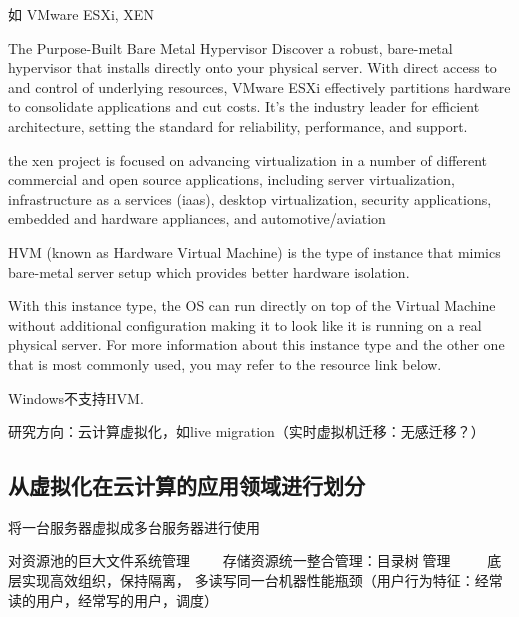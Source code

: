 如 VMware ESXi, XEN

\begin{definition}
    The Purpose-Built Bare Metal Hypervisor
Discover a robust, bare-metal hypervisor that installs directly onto your physical server. With direct access to and control of underlying resources, VMware ESXi effectively partitions hardware to consolidate applications and cut costs. It’s the industry leader for efficient architecture, setting the standard for reliability, performance, and support.
\end{definition}

\begin{definition}[Xen]
    the xen project is focused on advancing virtualization in a number of different commercial and open source applications, including server virtualization, infrastructure as a services (iaas), desktop virtualization, security applications, embedded and hardware appliances, and automotive/aviation
\end{definition}

\begin{definition}
    HVM (known as Hardware Virtual Machine) is the type of instance that mimics bare-metal server setup which provides better hardware isolation. 
    
    With this instance type, the OS can run directly on top of the Virtual Machine without additional configuration making it to look like it is running on a real physical server. For more information about this instance type and the other one that is most commonly used, you may refer to the resource link below.
\end{definition}

\begin{remark}
    Windows不支持HVM.
\end{remark}

研究方向：云计算虚拟化，如live migration（实时虚拟机迁移：无感迁移？）


\subsection{从虚拟化在云计算的应用领域进行划分}
\begin{definition}[服务器虚拟化]
    将一台服务器虚拟成多台服务器进行使用

    对资源池的巨大文件系统管理 
　　存储资源统一整合管理：目录树🌲管理
　　🔀底层实现高效组织，保持隔离，
多‍‍‍读写同一台机器性能瓶颈（用户行为特征：经常读的用户，经常写的用户，调度）
\end{definition}

